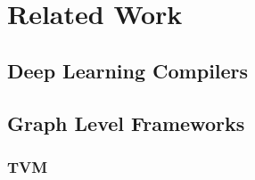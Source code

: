 
\chapter{Related Work} %

\label{Chapter2} %

\section{Deep Learning Compilers}

%
%
%




\section{Graph Level Frameworks}


\subsection{TVM}

